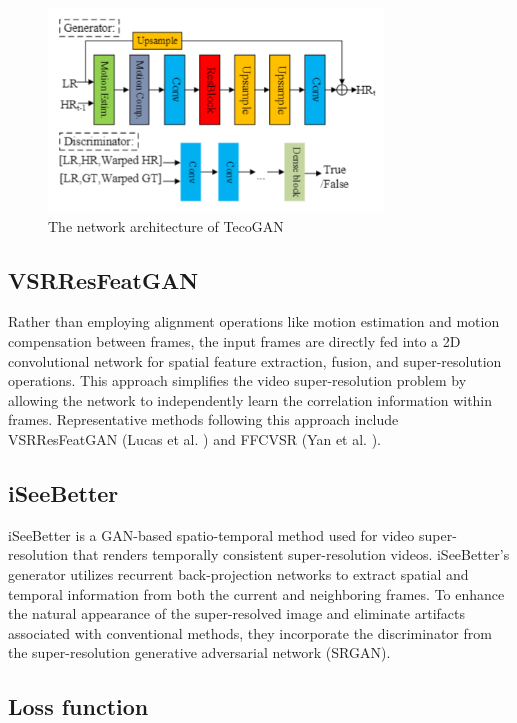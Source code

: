 \documentclass[conference]{IEEEtran}
\begin{document}
\begin{figure}[b]
    \centering
    \centerline{\includegraphics[width=8.9cm]{tecogan}}
    \caption{The network architecture of TecoGAN \cite{video_super_resolution_survey_2020}}
    \label{fig:tecogan}
\end{figure}

\subsection{VSRResFeatGAN}

Rather than employing alignment operations like motion estimation and motion compensation between frames, the input frames are directly fed into a 2D convolutional network for spatial feature extraction, fusion, and super-resolution operations. This approach simplifies the video super-resolution problem by allowing the network to independently learn the correlation information within frames. Representative methods following this approach include VSRResFeatGAN (Lucas et al. \cite{GANs_perc_loss_vsr_2018}) and FFCVSR (Yan et al. \cite{Yan_frame_vsr_2019}).

\subsection{iSeeBetter}

iSeeBetter \cite{iSeeBetter_2020} is a GAN-based spatio-temporal method used for video super-resolution that renders temporally consistent super-resolution videos. iSeeBetter's generator utilizes recurrent back-projection networks to extract spatial and temporal information from both the current and neighboring frames. To enhance the natural appearance of the super-resolved image and eliminate artifacts associated with conventional methods, they incorporate the discriminator from the super-resolution generative adversarial network (SRGAN).

\subsection{Loss function\label{sec:loss_function}}
\end{document}
